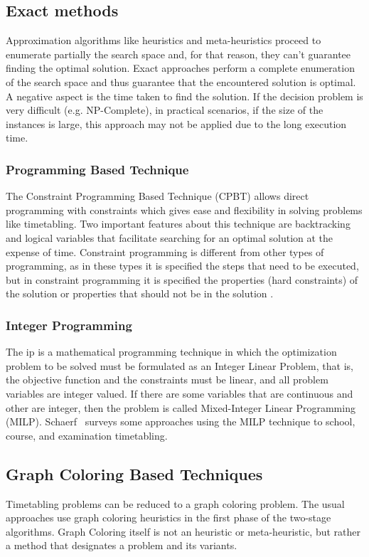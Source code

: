 \subsection{Exact methods}
\label{subsection:exactmethods}
Approximation algorithms like heuristics and meta-heuristics proceed to enumerate partially the search space and, for that reason, they can't guarantee finding the optimal solution. Exact approaches perform a complete enumeration of the search space and thus guarantee that the encountered solution is optimal. A negative aspect is the time taken to find the solution. If the decision problem is very difficult (e.g. NP-Complete), in practical scenarios, if the size of the instances is large, this approach may not be applied due to the long execution time.\\

\subsubsection{Programming Based Technique}
The Constraint Programming Based Technique (CPBT) allows direct programming with constraints which gives ease and flexibility in solving problems like timetabling. Two important features about this technique are backtracking and logical variables that facilitate searching for an optimal solution at the expense of time. Constraint programming is different from other types of programming, as in these types it is specified the steps that need to be executed, but in constraint programming it is specified the properties (hard constraints) of the solution or properties that should not be in the solution \cite{Qu2009}.\\

\subsubsection{Integer Programming}
The \gls{ip} is a mathematical programming technique in which the optimization problem to be solved must be formulated as an Integer Linear Problem, that is, the objective function and the constraints must be linear, and all problem variables are integer valued. If there are some variables that are continuous and other are integer, then the problem is called Mixed-Integer Linear Programming (MILP). Schaerf~\cite{Schaerf1999} surveys some approaches using the MILP technique to school, course, and examination timetabling.

\subsection{Graph Coloring Based Techniques}
\label{subsection:graphcoloring}
Timetabling problems can be reduced to a graph coloring problem. The usual approaches use graph coloring heuristics in the first phase of the two-stage algorithms. Graph Coloring itself is not an heuristic or meta-heuristic, but rather a method that designates a problem and its variants.\\


